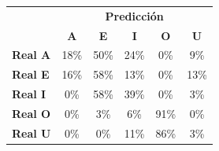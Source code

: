 \begin{tabular}{lccccc}
\toprule
 & \multicolumn{5}{c}{\textbf{Predicción}} \\
 & \textbf{A} & \textbf{E} & \textbf{I} & \textbf{O} & \textbf{U} \\
\midrule
\textbf{Real A} & \cellcolor[rgb]{0.88,0.88,1.00}  18\% & \cellcolor[rgb]{0.65,0.65,1.00} \color{white} 50\% & \cellcolor[rgb]{0.84,0.84,1.00}  24\% & \cellcolor[rgb]{1.00,1.00,1.00}  0\% & \cellcolor[rgb]{0.94,0.94,1.00}  9\% \\
\textbf{Real E} & \cellcolor[rgb]{0.89,0.89,1.00}  16\% & \cellcolor[rgb]{0.59,0.59,1.00} \color{white} 58\% & \cellcolor[rgb]{0.91,0.91,1.00}  13\% & \cellcolor[rgb]{1.00,1.00,1.00}  0\% & \cellcolor[rgb]{0.91,0.91,1.00}  13\% \\
\textbf{Real I} & \cellcolor[rgb]{1.00,1.00,1.00}  0\% & \cellcolor[rgb]{0.59,0.59,1.00} \color{white} 58\% & \cellcolor[rgb]{0.73,0.73,1.00}  39\% & \cellcolor[rgb]{1.00,1.00,1.00}  0\% & \cellcolor[rgb]{0.98,0.98,1.00}  3\% \\
\textbf{Real O} & \cellcolor[rgb]{1.00,1.00,1.00}  0\% & \cellcolor[rgb]{0.98,0.98,1.00}  3\% & \cellcolor[rgb]{0.96,0.96,1.00}  6\% & \cellcolor[rgb]{0.36,0.36,1.00} \color{white} 91\% & \cellcolor[rgb]{1.00,1.00,1.00}  0\% \\
\textbf{Real U} & \cellcolor[rgb]{1.00,1.00,1.00}  0\% & \cellcolor[rgb]{1.00,1.00,1.00}  0\% & \cellcolor[rgb]{0.92,0.92,1.00}  11\% & \cellcolor[rgb]{0.40,0.40,1.00} \color{white} 86\% & \cellcolor[rgb]{0.98,0.98,1.00}  3\% \\
\bottomrule
\end{tabular}